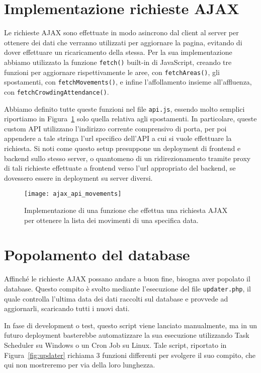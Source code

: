 \section{Implementazione richieste AJAX}
Le richieste AJAX sono effettuate in modo asincrono dal client al server per ottenere dei dati che verranno utilizzati per aggiornare la pagina, evitando di dover effettuare un ricaricamento della stessa. Per la sua implementazione abbiamo utilizzato la funzione \Verb_fetch()_ built-in di JavaScript, creando tre funzioni per aggiornare rispettivamente le aree, con \Verb_fetchAreas()_, gli spostamenti, con \Verb_fetchMovements()_, e infine l'affollamento insieme all'affluenza, con \Verb_fetchCrowdingAttendance()_. 

Abbiamo definito tutte queste funzioni nel file \Verb_api.js_, essendo molto semplici riportiamo in Figura~\ref{fig:ajax_api_movements} solo quella relativa agli spostamenti. In particolare, queste custom API utilizzano l'indirizzo corrente comprensivo di porta, per poi appendere a tale stringa l'url specifico dell'API a cui si vuole effettuare la richiesta. Si noti come questo setup presuppone un deployment di frontend e backend sullo stesso server, o quantomeno di un ridirezionamento tramite proxy di tali richieste effettuate a frontend verso l'url appropriato del backend, se dovessero essere in deployment su server diversi.

\begin{figure}[H]
    \centering
    \texttt{[image: ajax\_api\_movements]}
    \caption[Richiesta AJAX per ottenere la lista dei movimenti]{Implementazione di una funzione che effettua una richiesta AJAX per ottenere la lista dei movimenti di una specifica data.}
    \label{fig:ajax_api_movements}
\end{figure}

\section{Popolamento del database}
Affinché le richieste AJAX possano andare a buon fine, bisogna aver popolato il database. Questo compito è svolto mediante l'esecuzione del file \Verb_updater.php_, il quale controlla l'ultima data dei dati raccolti sul database e provvede ad aggiornarli, scaricando tutti i nuovi dati.

In fase di development o test, questo script viene lanciato manualmente, ma in un futuro deployment basterebbe automatizzare la sua esecuzione utilizzando Task Scheduler su Windows o un Cron Job su Linux. Tale script, riportato in Figura~\ref{fig:updater} richiama 3 funzioni differenti per svolgere il suo compito, che qui non mostreremo per via della loro lunghezza.

